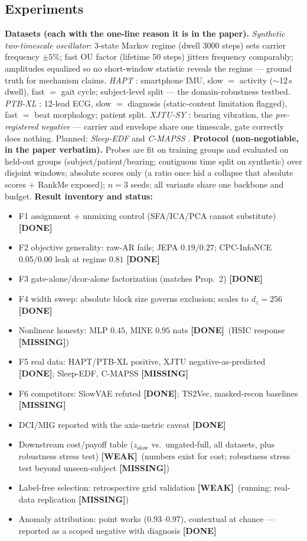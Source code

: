 \documentclass[10pt]{article}
\newcommand{\done}{\textcolor[rgb]{0,0.45,0}{\textbf{[DONE]}}}
\newcommand{\weak}{\textcolor[rgb]{0.8,0.5,0}{\textbf{[WEAK]}}}
\newcommand{\todo}{\textcolor[rgb]{0.75,0,0}{\textbf{[MISSING]}}}
\newcommand{\zslow}{z_{\mathrm{slow}}}
\begin{document}
\subsection{Experiments}
\textbf{Datasets (each with the one-line reason it is in the paper).}
\emph{Synthetic two-timescale oscillator}: 3-state Markov regime (dwell 3000
steps) sets carrier frequency $\pm5\%$; fast OU factor (lifetime 50 steps)
jitters frequency comparably; amplitudes equalized so no short-window
statistic reveals the regime --- ground truth for mechanism claims.
\emph{HAPT} \cite{reyes2016transition}: smartphone IMU, slow $=$ activity
($\sim$12\,s dwell), fast $=$ gait cycle; subject-level split --- the
domain-robustness testbed. \emph{PTB-XL} \cite{wagner2020ptb}: 12-lead ECG,
slow $=$ diagnosis (static-content limitation flagged), fast $=$ beat
morphology; patient split. \emph{XJTU-SY} \cite{wang2020xjtu}: bearing
vibration, the \emph{pre-registered negative} --- carrier and envelope share
one timescale, gate correctly does nothing. Planned: \emph{Sleep-EDF}
\cite{kemp2000analysis} and \emph{C-MAPSS} \cite{saxena2008damage}.
\textbf{Protocol (non-negotiable, in the paper verbatim).} Probes are fit on
training groups and evaluated on held-out groups (subject/patient/bearing;
contiguous time split on synthetic) over disjoint windows; absolute scores
only (a ratio once hid a collapse that absolute scores + RankMe exposed);
$n{=}3$ seeds; all variants share one backbone and budget.
\textbf{Result inventory and status:}
\begin{itemize}[leftmargin=1.3em,itemsep=0pt,topsep=1pt]
\item F1 assignment + unmixing control (SFA/ICA/PCA cannot substitute) \done
\item F2 objective generality: raw-AR fails; JEPA $0.19/0.27$; CPC-InfoNCE
$0.05/0.00$ leak at regime $0.81$ \done
\item F3 gate-alone/dcor-alone factorization (matches Prop.~2) \done
\item F4 width sweep: absolute block size governs exclusion; scales to
$d_z{=}256$ \done
\item Nonlinear honesty: MLP $0.45$, MINE $0.95$ nats \done\ (HSIC response
\todo)
\item F5 real data: HAPT/PTB-XL positive, XJTU negative-as-predicted \done;
Sleep-EDF, C-MAPSS \todo
\item F6 competitors: SlowVAE refuted \done; TS2Vec, masked-recon baselines
\todo
\item DCI/MIG reported with the axis-metric caveat \done
\item Downstream cost/payoff table ($\zslow$ vs.\ ungated-full, all datasets,
plus robustness stress test) \weak\ (numbers exist for cost; robustness
stress test beyond unseen-subject \todo)
\item Label-free selection: retrospective grid validation \weak\ (running;
real-data replication \todo)
\item Anomaly attribution: point works ($0.93$--$0.97$), contextual at
chance --- reported as a scoped negative with diagnosis \done
\end{itemize}
\end{document}

